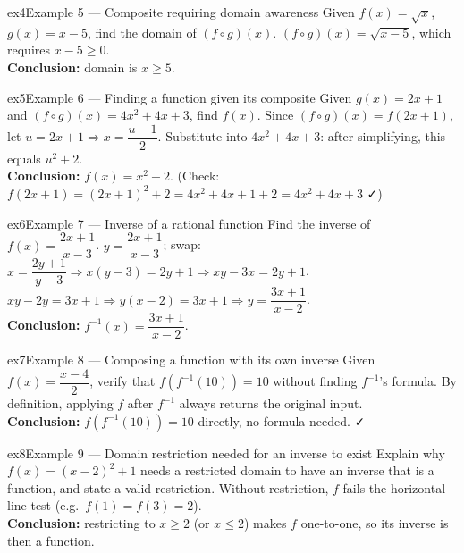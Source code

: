 \documentclass[11pt]{article}
\begin{document}
\begin{example}{ex4}{Example 5 --- Composite requiring domain awareness}
Given $f(x)=\sqrt x$, $g(x)=x-5$, find the domain of $(f\circ g)(x)$.\soln
$(f\circ g)(x)=\sqrt{x-5}$, which requires $x-5\geq0$.\\[3pt]\textbf{Conclusion:} domain is $x\geq5$.
\end{example}

\begin{example}{ex5}{Example 6 --- Finding a function given its composite}
Given $g(x)=2x+1$ and $(f\circ g)(x)=4x^2+4x+3$, find $f(x)$.\soln
Since $(f\circ g)(x)=f(2x+1)$, let $u=2x+1\Rightarrow x=\dfrac{u-1}2$. Substitute into $4x^2+4x+3$: after simplifying, this equals $u^2+2$.\\[3pt]\textbf{Conclusion:} $f(x)=x^2+2$. (Check: $f(2x+1)=(2x+1)^2+2=4x^2+4x+1+2=4x^2+4x+3$ ✓)
\end{example}

\begin{example}{ex6}{Example 7 --- Inverse of a rational function}
Find the inverse of $f(x)=\dfrac{2x+1}{x-3}$.\soln
$y=\dfrac{2x+1}{x-3}$; swap: $x=\dfrac{2y+1}{y-3}\Rightarrow x(y-3)=2y+1\Rightarrow xy-3x=2y+1$.\\[3pt]
$xy-2y=3x+1\Rightarrow y(x-2)=3x+1\Rightarrow y=\dfrac{3x+1}{x-2}$.\\[3pt]\textbf{Conclusion:} $f^{-1}(x)=\dfrac{3x+1}{x-2}$.
\end{example}

\begin{example}{ex7}{Example 8 --- Composing a function with its own inverse}
Given $f(x)=\dfrac{x-4}{2}$, verify that $f(f^{-1}(10))=10$ without finding $f^{-1}$'s formula.\soln
By definition, applying $f$ after $f^{-1}$ always returns the original input.\\[3pt]\textbf{Conclusion:} $f(f^{-1}(10))=10$ directly, no formula needed. ✓
\end{example}

\begin{example}{ex8}{Example 9 --- Domain restriction needed for an inverse to exist}
Explain why $f(x)=(x-2)^2+1$ needs a restricted domain to have an inverse that is a function, and state a valid restriction.\soln
Without restriction, $f$ fails the horizontal line test (e.g.\ $f(1)=f(3)=2$).\\[3pt]\textbf{Conclusion:} restricting to $x\geq2$ (or $x\leq2$) makes $f$ one-to-one, so its inverse is then a function.
\end{example}
\end{document}
